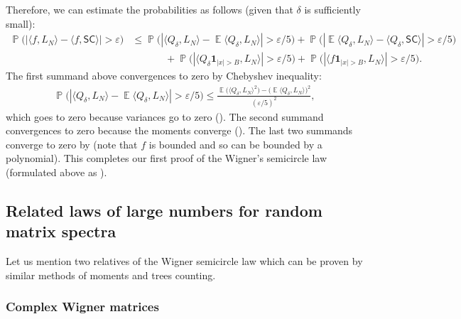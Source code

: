\documentclass[letterpaper,11pt,oneside,reqno]{amsart}
\numberwithin{equation}{section}
\newcommand{\SC}{\mathsf{SC}}
\DeclareMathOperator{\EE}{\mathbb{E}}
\DeclareMathOperator{\PP}{\mathbb{P}}
\theoremstyle{definition}
\begin{document}
Therefore, we can estimate the probabilities as follows
(given that $\delta$ is sufficiently small):
\begin{align*}
	\PP\Big(\left|
	\langle f,L_N\rangle-
	\langle f,\SC\rangle
	\right|
	>\varepsilon\Big)&\le
	\PP\Big(
	\left|
	\langle Q_{\delta},L_N\rangle-
	\EE\langle Q_{\delta},L_N\rangle
	\right|>\varepsilon/5
	\Big)
	+
	\PP\Big(\left|
	\EE\langle Q_{\delta},L_N\rangle-
	\langle Q_{\delta},\SC\rangle
	\right|>\varepsilon/5\Big)
	\\&\hspace{40pt}+
	\PP\Big(\left|
	\langle Q_{\delta}\mathbf{1}_{|x|> B},L_N\rangle
	\right|>\varepsilon/5\Big)
	+
	\PP\Big(
	\left|
	\langle f\mathbf{1}_{|x|> B},L_N\rangle
	\right|>\varepsilon/5\Big).
\end{align*}
The first summand above convergences to zero by Chebyshev inequality:
\begin{align*}
	\PP\Big(
	\left|
	\langle Q_{\delta},L_N\rangle-
	\EE\langle Q_{\delta},L_N\rangle
	\right|>\varepsilon/5
	\Big)\le
	\frac{\EE\big(\langle Q_{\delta},L_N\rangle^{2}\big)
	-\big(\EE\langle Q_{\delta},L_N\rangle\big)^{2}}{(\varepsilon/5)^{2}},
\end{align*}
which goes to zero because variances go to zero
().
The second summand convergences to zero because the moments
converge ().
The last two summands converge to zero by
 (note that $f$ is bounded and so 
can be bounded by a polynomial). 
This completes our first proof of the Wigner's semicircle law
(formulated above as ).


\subsection{Related laws of large numbers for random matrix spectra} %
\label{sub:remarks_on_the_semicircle_law_for_real_wigner_matrices}

Let us mention two relatives of the Wigner semicircle law which can be proven by similar 
methods of moments and
trees counting.

\subsubsection{Complex Wigner matrices} %
\label{ssub:complex_wigner_matrices}
	
\end{document}
